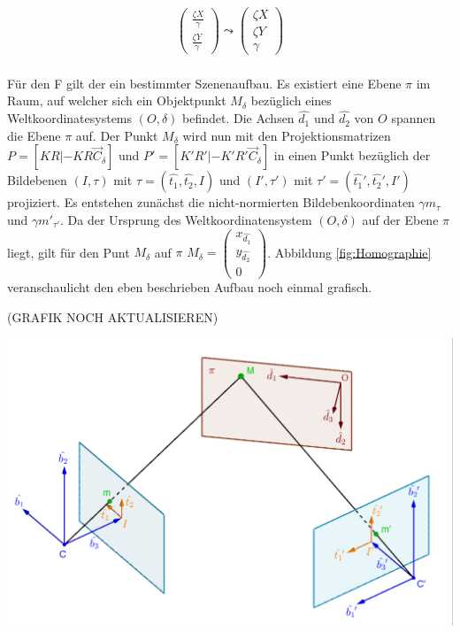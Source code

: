 \begin{gather}
	\begin{pmatrix}
		\frac{\zeta X}{\gamma}\\ \frac{\zeta Y}{\gamma}
	\end{pmatrix}
 \leadsto 
 \begin{pmatrix}
		\zeta X\\ \zeta Y\\\gamma
	\end{pmatrix}
\end{gather}\\


Für den F gilt der ein bestimmter Szenenaufbau. Es existiert eine Ebene $\pi$ im Raum, auf welcher sich ein Objektpunkt $M_\delta$ bezüglich eines Weltkoordinatesystems $(O,\delta)$ befindet. Die Achsen $\hat{d_1}$ und $\hat{d_2}$ von $O$ spannen die Ebene $\pi$ auf. Der Punkt $M_\delta$ wird nun mit den Projektionsmatrizen $P = [KR|-KR\vec{C}_\delta]$ und $P'=	[K'R'|-K'R'\vec{C}_\delta]$ in einen Punkt bezüglich der Bildebenen $(I,\tau)$ mit $\tau = (\hat{t_1}, \hat{t_2},I)$ und $(I',\tau')$ mit $\tau' = (\hat{t_1}', \hat{t_2}',I')$ projiziert. Es entstehen zunächst die nicht-normierten Bildebenkoordinaten $\gamma m_\tau$ und $\gamma m'_{\tau'}$.  Da der Ursprung des Weltkoordinatensystem $(O,\delta)$ auf der Ebene $\pi$ liegt, gilt für den Punt $M_\delta$ auf $\pi$ $M_\delta = \begin{pmatrix}
x_{\hat{d_1}}\\
y_{\hat{d_2}}\\
0
\end{pmatrix}$. Abbildung \ref{fig:Homographie} veranschaulicht den eben beschrieben Aufbau noch einmal grafisch.

(GRAFIK NOCH AKTUALISIEREN)\\
\begin{minipage}{\linewidth}
 	\centering
 	\includegraphics[width=0.8\linewidth]{images/HomographieDP_beschriftet.png}
 	\label{fig:Homographie}
 \end{minipage}\\


